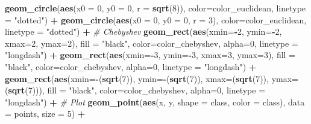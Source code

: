 \documentclass[]{article}
\newenvironment{Shaded}{\begin{snugshade}}{\end{snugshade}}
\newcommand{\CommentTok}[1]{\textcolor[rgb]{0.56,0.35,0.01}{\textit{#1}}}
\newcommand{\DataTypeTok}[1]{\textcolor[rgb]{0.13,0.29,0.53}{#1}}
\newcommand{\DecValTok}[1]{\textcolor[rgb]{0.00,0.00,0.81}{#1}}
\newcommand{\KeywordTok}[1]{\textcolor[rgb]{0.13,0.29,0.53}{\textbf{#1}}}
\newcommand{\NormalTok}[1]{#1}
\newcommand{\OperatorTok}[1]{\textcolor[rgb]{0.81,0.36,0.00}{\textbf{#1}}}
\newcommand{\StringTok}[1]{\textcolor[rgb]{0.31,0.60,0.02}{#1}}
\begin{document}
\begin{Shaded}
\begin{Highlighting}[]
\StringTok{  }\KeywordTok{geom_circle}\NormalTok{(}\KeywordTok{aes}\NormalTok{(}\DataTypeTok{x0 =} \DecValTok{0}\NormalTok{, }\DataTypeTok{y0 =} \DecValTok{0}\NormalTok{, }\DataTypeTok{r =} \KeywordTok{sqrt}\NormalTok{(}\DecValTok{8}\NormalTok{)),  }\DataTypeTok{color=}\NormalTok{color_euclidean, }\DataTypeTok{linetype =} \StringTok{"dotted"}\NormalTok{) }\OperatorTok{+}
\StringTok{  }\KeywordTok{geom_circle}\NormalTok{(}\KeywordTok{aes}\NormalTok{(}\DataTypeTok{x0 =} \DecValTok{0}\NormalTok{, }\DataTypeTok{y0 =} \DecValTok{0}\NormalTok{, }\DataTypeTok{r =} \DecValTok{3}\NormalTok{),  }\DataTypeTok{color=}\NormalTok{color_euclidean, }\DataTypeTok{linetype =} \StringTok{"dotted"}\NormalTok{) }\OperatorTok{+}
\StringTok{  }\CommentTok{# Chebyshev}
\StringTok{  }\KeywordTok{geom_rect}\NormalTok{(}\KeywordTok{aes}\NormalTok{(}\DataTypeTok{xmin=}\OperatorTok{-}\DecValTok{2}\NormalTok{, }\DataTypeTok{ymin=}\OperatorTok{-}\DecValTok{2}\NormalTok{, }\DataTypeTok{xmax=}\DecValTok{2}\NormalTok{, }\DataTypeTok{ymax=}\DecValTok{2}\NormalTok{), }\DataTypeTok{fill =} \StringTok{"black"}\NormalTok{, }\DataTypeTok{color=}\NormalTok{color_chebyshev, }\DataTypeTok{alpha=}\DecValTok{0}\NormalTok{, }\DataTypeTok{linetype =} \StringTok{"longdash"}\NormalTok{) }\OperatorTok{+}
\StringTok{  }\KeywordTok{geom_rect}\NormalTok{(}\KeywordTok{aes}\NormalTok{(}\DataTypeTok{xmin=}\OperatorTok{-}\DecValTok{3}\NormalTok{, }\DataTypeTok{ymin=}\OperatorTok{-}\DecValTok{3}\NormalTok{, }\DataTypeTok{xmax=}\DecValTok{3}\NormalTok{, }\DataTypeTok{ymax=}\DecValTok{3}\NormalTok{), }\DataTypeTok{fill =} \StringTok{"black"}\NormalTok{, }\DataTypeTok{color=}\NormalTok{color_chebyshev, }\DataTypeTok{alpha=}\DecValTok{0}\NormalTok{, }\DataTypeTok{linetype =} \StringTok{"longdash"}\NormalTok{) }\OperatorTok{+}
\StringTok{  }\KeywordTok{geom_rect}\NormalTok{(}\KeywordTok{aes}\NormalTok{(}\DataTypeTok{xmin=}\OperatorTok{-}\NormalTok{(}\KeywordTok{sqrt}\NormalTok{(}\DecValTok{7}\NormalTok{)), }\DataTypeTok{ymin=}\OperatorTok{-}\NormalTok{(}\KeywordTok{sqrt}\NormalTok{(}\DecValTok{7}\NormalTok{)), }\DataTypeTok{xmax=}\NormalTok{(}\KeywordTok{sqrt}\NormalTok{(}\DecValTok{7}\NormalTok{)), }\DataTypeTok{ymax=}\NormalTok{(}\KeywordTok{sqrt}\NormalTok{(}\DecValTok{7}\NormalTok{))), }\DataTypeTok{fill =} \StringTok{"black"}\NormalTok{, }\DataTypeTok{color=}\NormalTok{color_chebyshev, }\DataTypeTok{alpha=}\DecValTok{0}\NormalTok{, }\DataTypeTok{linetype =} \StringTok{"longdash"}\NormalTok{) }\OperatorTok{+}
\StringTok{  }\CommentTok{# Plot}
\StringTok{  }\KeywordTok{geom_point}\NormalTok{(}\KeywordTok{aes}\NormalTok{(x, y, }\DataTypeTok{shape =}\NormalTok{ class, }\DataTypeTok{color =}\NormalTok{ class), }\DataTypeTok{data =}\NormalTok{ points, }\DataTypeTok{size =} \DecValTok{5}\NormalTok{) }\OperatorTok{+}

\end{Highlighting}
\end{Shaded}
\end{document}

